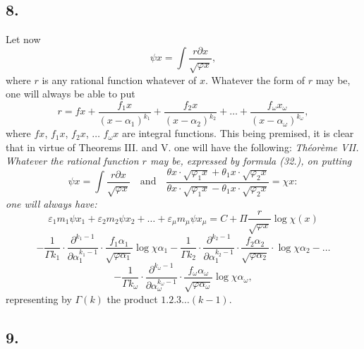 \documentclass{article}
\begin{document}
\subsection*{8.}

Let now
\[ \psi x = \int \frac{r\partial x}{\sqrt{\varphi x}}, \]
where $r$ is any rational function whatever of $x$. Whatever the form of $r$ may be, one will always be able to put
\[ r = fx + \frac{f_1 x}{(x-\alpha_1)^{k_1}} + \frac{f_2 x}{(x-\alpha_2)^{k_2}} + \ldots + \frac{f_\omega x_\omega}{(x-\alpha_\omega)^{k_\omega}}, \tag{32} \]
where $fx$, $f_1 x$, $f_2 x$, $\ldots$ $f_\omega x$ are integral functions. This being premised, it is clear that in virtue of Theorems III. and V. one will have the following:
\emph{Théorème VII. Whatever the rational function $r$ may be, expressed by formula (32.), on putting}
\[ \psi x = \int \frac{r\partial x}{\sqrt{\varphi x}} \quad\text{and}\quad \frac{\theta x \cdot \sqrt{\varphi_1 x}+\theta_1 x \cdot \sqrt{\varphi_2 x}}{\theta x \cdot \sqrt{\varphi_1 x}-\theta_1 x \cdot \sqrt{\varphi_2 x}} = \chi x: \tag{33} \]
\emph{one will always have:}
\[ \varepsilon_1 m_1\psi x_1 + \varepsilon_2 m_2\psi x_2 + \ldots + \varepsilon_\mu m_\mu\psi x_\mu = C + \Pi\frac{r}{\sqrt{\varphi x}}\log\chi(x) \tag{34} \]
\[ - \frac{1}{\Gamma k_1} \cdot \frac{\partial^{k_1-1}}{\partial\alpha_1^{k_1-1}} \cdot \frac{f_1\alpha_1}{\sqrt{\varphi\alpha_1}}\log\chi\alpha_1 - \frac{1}{\Gamma k_2} \cdot \frac{\partial^{k_2-1}}{\partial\alpha_1^{k_2-1}} \cdot \frac{f_2\alpha_2}{\sqrt{\varphi\alpha_2}} \cdot \log\chi\alpha_2 - \ldots \]
\[ - \frac{1}{\Gamma k_\omega} \cdot \frac{\partial^{k_\omega-1}}{\partial\alpha_\omega^{k_\omega-1}} \cdot \frac{f_\omega\alpha_\omega}{\sqrt{\varphi\alpha_\omega}}\log\chi\alpha_\omega, \]
representing by $\Gamma(k)$ the product $1.2.3\ldots(k-1)$.

\subsection*{9.}
\end{document}

